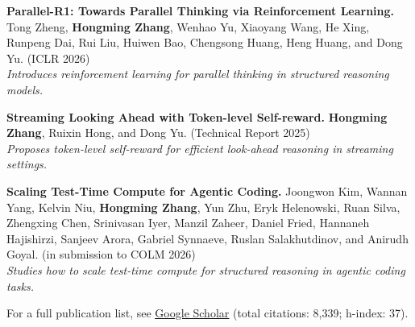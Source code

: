\begin{cvitems}
  \item {\textbf{Parallel-R1: Towards Parallel Thinking via Reinforcement Learning.} Tong Zheng, \textbf{Hongming Zhang}, Wenhao Yu, Xiaoyang Wang, He Xing, Runpeng Dai, Rui Liu, Huiwen Bao, Chengsong Huang, Heng Huang, and Dong Yu. (ICLR 2026)\\
  \hspace*{1.5em}\textit{Introduces reinforcement learning for parallel thinking in structured reasoning models.}}
  \item {\textbf{Streaming Looking Ahead with Token-level Self-reward.} \textbf{Hongming Zhang}, Ruixin Hong, and Dong Yu. (Technical Report 2025)\\
  \hspace*{1.5em}\textit{Proposes token-level self-reward for efficient look-ahead reasoning in streaming settings.}}
  \item {\textbf{Scaling Test-Time Compute for Agentic Coding.} Joongwon Kim, Wannan Yang, Kelvin Niu, \textbf{Hongming Zhang}, Yun Zhu, Eryk Helenowski, Ruan Silva, Zhengxing Chen, Srinivasan Iyer, Manzil Zaheer, Daniel Fried, Hannaneh Hajishirzi, Sanjeev Arora, Gabriel Synnaeve, Ruslan Salakhutdinov, and Anirudh Goyal. (in submission to COLM 2026)\\
  \hspace*{1.5em}\textit{Studies how to scale test-time compute for structured reasoning in agentic coding tasks.}}
\end{cvitems}

\begin{cvparagraph}
For a full publication list, see \href{https://scholar.google.com/citations?hl=en&user=i5ETuuQAAAAJ}{\underline{Google Scholar}} (total citations: 8,339; h-index: 37).
\end{cvparagraph}
